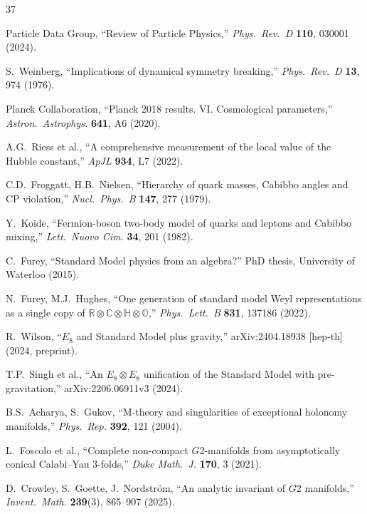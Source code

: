 \documentclass[11pt,a4paper]{article}
\newcommand{\E}{\mathrm{E}}
\newcommand{\Gtwo}{\mathrm{G}_2}
\def\Gtwo{G2}%
\def\E{E}%
\begin{document}
\begin{thebibliography}{37}

 Particle Data Group, ``Review of Particle Physics,'' \textit{Phys.\ Rev.\ D} \textbf{110}, 030001 (2024).

 S.~Weinberg, ``Implications of dynamical symmetry breaking,'' \textit{Phys.\ Rev.\ D} \textbf{13}, 974 (1976).

 Planck Collaboration, ``Planck 2018 results. VI. Cosmological parameters,'' \textit{Astron.\ Astrophys.} \textbf{641}, A6 (2020).

 A.G.~Riess et al., ``A comprehensive measurement of the local value of the Hubble constant,'' \textit{ApJL} \textbf{934}, L7 (2022).

 C.D.~Froggatt, H.B.~Nielsen, ``Hierarchy of quark masses, Cabibbo angles and CP violation,'' \textit{Nucl.\ Phys.\ B} \textbf{147}, 277 (1979).

 Y.~Koide, ``Fermion-boson two-body model of quarks and leptons and Cabibbo mixing,'' \textit{Lett.\ Nuovo Cim.} \textbf{34}, 201 (1982).

 C.~Furey, ``Standard Model physics from an algebra?'' PhD thesis, University of Waterloo (2015).

 N.~Furey, M.J.~Hughes, ``One generation of standard model Weyl representations as a single copy of $\mathbb{R} \otimes \mathbb{C} \otimes \mathbb{H} \otimes \mathbb{O}$,'' \textit{Phys.\ Lett.\ B} \textbf{831}, 137186 (2022).

 R.~Wilson, ``$\E_8$ and Standard Model plus gravity,'' arXiv:2404.18938 [hep-th] (2024, preprint).

 T.P.~Singh et al., ``An $\E_8 \otimes \E_8$ unification of the Standard Model with pre-gravitation,'' arXiv:2206.06911v3 (2024).

 B.S.~Acharya, S.~Gukov, ``M-theory and singularities of exceptional holonomy manifolds,'' \textit{Phys.\ Rep.} \textbf{392}, 121 (2004).

 L.~Foscolo et al., ``Complete non-compact $\Gtwo$-manifolds from asymptotically conical Calabi--Yau 3-folds,'' \textit{Duke Math.\ J.} \textbf{170}, 3 (2021).

 D.~Crowley, S.~Goette, J.~Nordstr\"om, ``An analytic invariant of $\Gtwo$ manifolds,'' \textit{Invent.\ Math.} \textbf{239}(3), 865--907 (2025).


\end{thebibliography}
\end{document}
